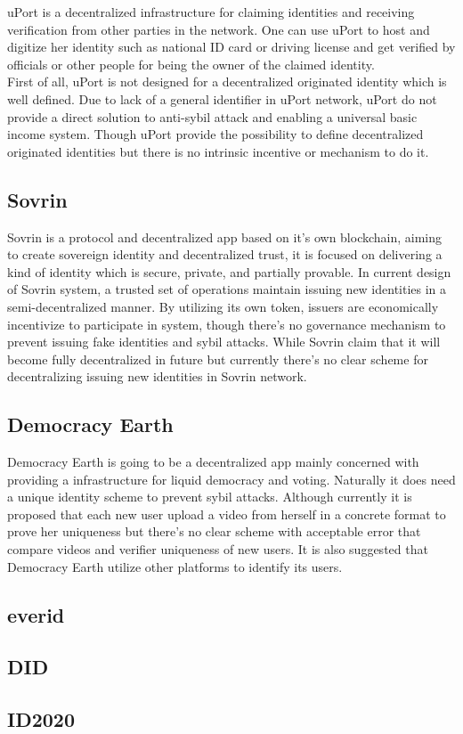 \documentclass{article}
\begin{document}
uPort is a decentralized infrastructure for claiming identities and receiving verification from other parties in the network. One can use uPort to host and digitize her identity such as national ID card or driving license and get verified by officials or other people for being the owner of the claimed identity.\\
 First of all, uPort is not designed for a decentralized originated identity which is well defined. Due to lack of a general identifier in uPort network, uPort do not provide a direct solution to anti-sybil attack and enabling a universal basic income system. Though uPort provide the possibility to define decentralized originated identities but there is no intrinsic incentive or mechanism to do it.

\subsection{Sovrin}

Sovrin is a protocol and decentralized app based on it’s own blockchain, aiming to create sovereign identity and decentralized trust, it is focused on delivering a kind of identity which is secure, private, and partially provable. In current design of Sovrin system, a trusted set of operations maintain issuing new identities in a semi-decentralized manner. By utilizing its own token, issuers are economically incentivize to participate in system, though there’s no governance mechanism to prevent issuing fake identities and sybil attacks. While Sovrin claim that it will become fully decentralized in future but currently there’s no clear scheme for decentralizing issuing new identities in Sovrin network. 

\subsection{Democracy Earth}
Democracy Earth is going to be a decentralized app mainly concerned with providing a infrastructure for liquid democracy and voting. Naturally it does need a unique identity scheme to prevent sybil attacks. Although currently it is proposed that each new user upload a video from herself in a concrete format to prove her uniqueness but there’s no clear scheme with acceptable error that compare videos and verifier uniqueness of new users. It is also suggested that Democracy Earth utilize other platforms to identify its users.
\subsection{everid}
\subsection{ DID}
\subsection{ID2020}
\end{document}
